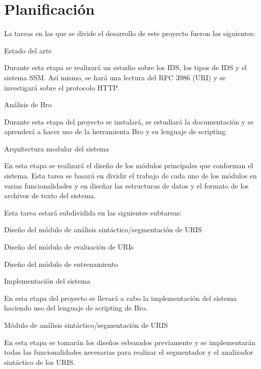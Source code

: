 \section{Planificación}

La tareas en las que se divide el desarrollo de este proyecto fueron las siguientes:


\begin{legal}
\item Estado del arte

Durante esta etapa se realizará un estudio sobre los IDS, los tipos de IDS y el sistema SSM. Así mismo, se hará una lectura del RFC 3986 (URI) y se investigará sobre el protocolo HTTP.

\item Análisis de Bro

Durante esta etapa del proyecto se instalará, se estudiará la documentación y se aprenderá a hacer uso de la herramienta Bro y su lenguaje de scripting.

\item Arquitectura modular del sistema 

En esta etapa se realizará el diseño de los módulos principales que conforman el sistema. Esta tarea se basará en dividir el trabajo de cada uno de los módulos en varias funcionalidades y en diseñar las estructuras de datos y el formato de los archivos de texto del sistema.

    Esta tarea estará subdividida en las siguientes subtareas:

\begin{legal}
\item Diseño del módulo de análisis sintáctico/segmentación de URIS 
\item Diseño del módulo de evaluación de URIs 
\item Diseño del módulo de entrenamiento 
\end{legal}
\item Implementación del sistema

En esta etapa del proyecto se llevará a cabo la implementación del sistema haciendo uso del lenguaje de scripting de Bro.

\begin{legal}
\item Módulo de análisis sintáctico/segmentación de URIS 

En esta etapa se tomarán los diseños esbozados previamente y se implementarán todas las funcionalidades necesarias para realizar el segmentador y el analizador sintáctico de los URIS.


\end{legal}
\end{legal}
